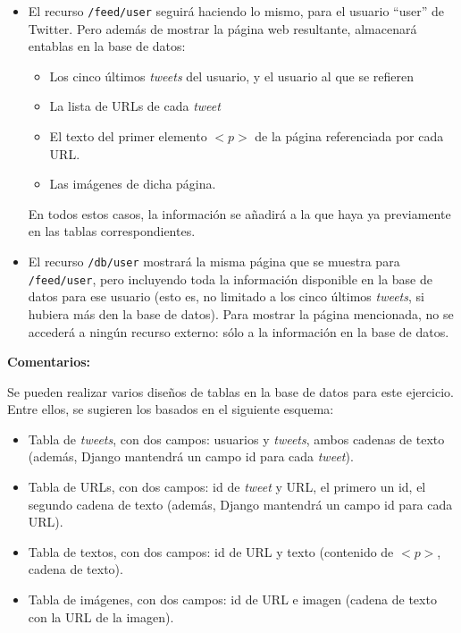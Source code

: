 \begin{itemize}
\item El recurso \verb|/feed/user| seguirá haciendo lo mismo, para el usuario ``user'' de Twitter. Pero además de mostrar la página web resultante, almacenará entablas en la base de datos:

  \begin{itemize}
  \item Los cinco últimos \emph{tweets} del usuario, y el usuario al que se refieren
  \item La lista de URLs de cada \emph{tweet}
  \item El texto del primer elemento $<p>$ de la página referenciada por cada URL.
  \item Las imágenes de dicha página.
  \end{itemize}

En todos estos casos, la información se añadirá a la que haya ya previamente en las tablas correspondientes.

\item El recurso \verb|/db/user| mostrará la misma página que se muestra para \verb|/feed/user|, pero incluyendo toda la información disponible en la base de datos para ese usuario (esto es, no limitado a los cinco últimos \emph{tweets}, si hubiera más den la base de datos). Para mostrar la página mencionada, no se accederá a ningún recurso externo: sólo a la información en la base de datos.
\end{itemize}

\textbf{Comentarios:}

Se pueden realizar varios diseños de tablas en la base de datos para este ejercicio. Entre ellos, se sugieren los basados en el siguiente esquema:

\begin{itemize}
\item Tabla de \emph{tweets}, con dos campos: usuarios y \emph{tweets}, ambos cadenas de texto (además, Django mantendrá un campo id para cada \emph{tweet}).
\item Tabla de URLs, con dos campos: id de \emph{tweet} y URL, el primero un id, el segundo cadena de texto (además, Django mantendrá un campo id para cada URL).
\item Tabla de textos, con dos campos: id de URL y texto (contenido de $<p>$, cadena de texto).
\item Tabla de imágenes, con dos campos: id de URL e imagen (cadena de texto con la URL de la imagen).
\end{itemize}

